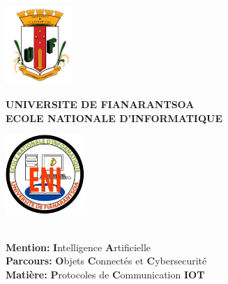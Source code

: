 \documentclass[a4paper,12pt]{report}
\begin{document}
\begin{titlepage}

\begin{center}
	\begin{minipage}{2.5cm}
	\begin{center}
		\includegraphics[height=3cm]{UF.png}
		
	\end{center}
\end{minipage}\hfill
\begin{minipage}{10cm}
	\begin{center}
    \textbf{UNIVERSITE DE FIANARANTSOA}\\[0.1cm]
    \vspace{3.5mm}
    \textbf{ECOLE NATIONALE D'INFORMATIQUE}\\[0.1cm]
	\end{center}
\end{minipage}\hfill
\begin{minipage}{2.5cm}
	\begin{center}
		\includegraphics[height=3cm]{eni.jpeg}
	\end{center}

\end{minipage}


\textsc{\Large}\\
{\large \bfseries Mention: }
{\large  \textbf{I}ntelligence \textbf{A}rtificielle}\\[0.5cm]

\textsc{\Large}
{\large \bfseries Parcours: }
{\large \textbf{O}bjets \textbf{C}onnectés et \textbf{C}ybersecurité }\\[0.5cm]

\textsc{\Large}
{\large \bfseries Matière: }
{\large \textbf{P}rotocoles de \textbf{C}ommunication \textbf{IOT} }\\[0.5cm]



\end{center}
\end{titlepage}
\end{document}
